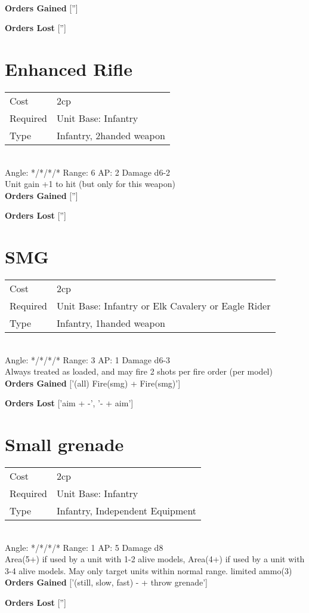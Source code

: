 \ \\

{\bf Orders Gained}
['']

{\bf Orders Lost}
['']
\section{ Enhanced Rifle }

\begin{tabular}{ll}
    Cost & 2cp \\
    Required & Unit Base: Infantry\\
    Type & Infantry, 2handed weapon\\
\end{tabular}
\ \\
\indent Angle: */*/*/* Range: 6  AP: 2 Damage d6-2 \\
Unit gain +1 to hit (but only for this weapon)
\ \\

{\bf Orders Gained}
['']

{\bf Orders Lost}
['']
\section{ SMG }

\begin{tabular}{ll}
    Cost & 2cp \\
    Required & Unit Base: Infantry or Elk Cavalery or Eagle Rider\\
    Type & Infantry, 1handed weapon\\
\end{tabular}
\ \\
\indent Angle: */*/*/* Range: 3  AP: 1 Damage d6-3 \\
Always treated as loaded, and may fire 2 shots per fire order (per model)
\ \\

{\bf Orders Gained}
['(all) Fire(smg) + Fire(smg)']

{\bf Orders Lost}
['aim + -', '- + aim']
\section{ Small grenade }

\begin{tabular}{ll}
    Cost & 2cp \\
    Required & Unit Base: Infantry\\
    Type & Infantry, Independent Equipment\\
\end{tabular}
\ \\
\indent Angle: */*/*/* Range: 1  AP: 5 Damage d8 \\
Area(5+) if used by a unit with 1-2 alive models, Area(4+) if used by a unit with 3-4 alive models. May only target units within normal range. limited ammo(3)
\ \\

{\bf Orders Gained}
['(still, slow, fast) - + throw grenade']

{\bf Orders Lost}
['']
